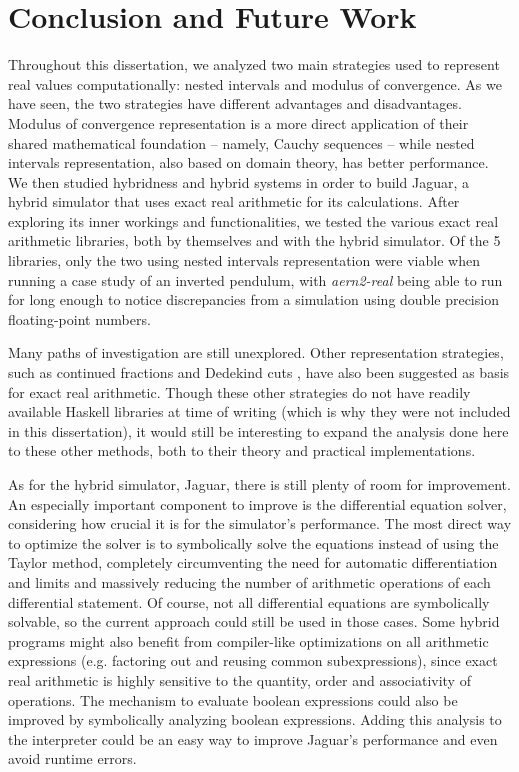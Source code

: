 \chapter{Conclusion and Future Work}
\label{chap:conclusion}

Throughout this dissertation, we analyzed two main strategies used to represent real values computationally: nested intervals and modulus of convergence. As we have seen, the two strategies have different advantages and disadvantages. Modulus of convergence representation is a more direct application of their shared mathematical foundation -- namely, Cauchy sequences -- while nested intervals representation, also based on domain theory, has better performance. We then studied hybridness and hybrid systems in order to build Jaguar, a hybrid simulator that uses exact real arithmetic for its calculations. After exploring its inner workings and functionalities, we tested the various exact real arithmetic libraries, both by themselves and with the hybrid simulator. Of the 5 libraries, only the two using nested intervals representation were viable when running a case study of an inverted pendulum, with \textit{aern2-real} being able to run for long enough to notice discrepancies from a simulation using double precision floating-point numbers.

Many paths of investigation are still unexplored. Other representation strategies, such as continued fractions \cite{khinchin-1961} and Dedekind cuts \cite{dedekind-1963}, have also been suggested as basis for exact real arithmetic. Though these other strategies do not have readily available Haskell libraries at time of writing (which is why they were not included in this dissertation), it would still be interesting to expand the analysis done here to these other methods, both to their theory and practical implementations.

As for the hybrid simulator, Jaguar, there is still plenty of room for improvement. An especially important component to improve is the differential equation solver, considering how crucial it is for the simulator's performance. The most direct way to optimize the solver is to symbolically solve the equations instead of using the Taylor method, completely circumventing the need for automatic differentiation and limits and massively reducing the number of arithmetic operations of each differential statement. Of course, not all differential equations are symbolically solvable, so the current approach could still be used in those cases. Some hybrid programs might also benefit from compiler-like optimizations on all arithmetic expressions (e.g. factoring out and reusing common subexpressions), since exact real arithmetic is highly sensitive to the quantity, order and associativity of operations. The mechanism to evaluate boolean expressions could also be improved by symbolically analyzing boolean expressions. Adding this analysis to the interpreter could be an easy way to improve Jaguar's performance and even avoid runtime errors.

